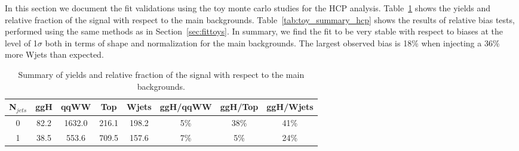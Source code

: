 In this section we document the fit validations using the toy 
monte carlo studies for the HCP analysis. 
Table~\ref{tab:yield_summary_hcp} shows the yields and relative fraction of the signal with respect to the main backgrounds. 
Table~\ref{tab:toy_summary_hcp} shows the results of relative bias tests, performed using 
the same methods as in Section~\ref{sec:fittoys}.
In summary, we find the fit to be very stable with respect to biases at the 
level of 1$\sigma$ both in terms of shape and normalization for the main backgrounds. 
The largest observed bias is 18\% when injecting a 36\% more Wjets than expected.

\begin{table}[!htb]
\begin{center}
\begin{tabular}{c | c c c c | c c c }
\hline
N$_{jets}$ & ggH & qqWW & Top & Wjets & ggH/qqWW & ggH/Top & ggH/Wjets \\
\hline
0 & 82.2 & 1632.0 & 216.1 & 198.2 & 5\% & 38\% & 41\% \\
1 & 38.5 &  553.6 & 709.5 & 157.6 & 7\% & 5\%  & 24\% \\
\hline
\end{tabular}
\caption{Summary of yields and relative fraction of the signal with respect to the main backgrounds.}
\label{tab:yield_summary_hcp}
\end{center}
\end{table}

